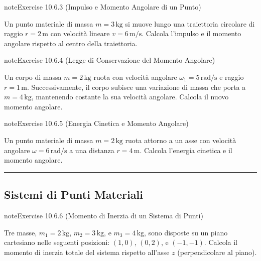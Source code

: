 \documentclass[letterpaper,10pt,italian]{jupyterBook}
\begin{document}
\begin{sphinxadmonition}{note}{Exercise 10.6.3 (Impulso e Momento Angolare di un Punto)}



\sphinxAtStartPar
Un punto materiale di massa \(m = 3 \, \text{kg}\) si muove lungo una traiettoria circolare di raggio \(r = 2 \, \text{m}\) con velocità lineare \(v = 6 \, \text{m/s}\). Calcola l’impulso e il momento angolare rispetto al centro della traiettoria.
\end{sphinxadmonition}
 \label{exercise:ch/mechanics/inertia-problems-exercise-3}

\begin{sphinxadmonition}{note}{Exercise 10.6.4 (Legge di Conservazione del Momento Angolare)}



\sphinxAtStartPar
Un corpo di massa \(m = 2 \, \text{kg}\) ruota con velocità angolare \(\omega_1 = 5 \, \text{rad/s}\) e raggio \(r = 1 \, \text{m}\). Successivamente, il corpo subisce una variazione di massa che porta a \(m = 4 \, \text{kg}\), mantenendo costante la sua velocità angolare. Calcola il nuovo momento angolare.
\end{sphinxadmonition}
 \label{exercise:ch/mechanics/inertia-problems-exercise-4}

\begin{sphinxadmonition}{note}{Exercise 10.6.5 (Energia Cinetica e Momento Angolare)}



\sphinxAtStartPar
Un punto materiale di massa \(m = 2 \, \text{kg}\) ruota attorno a un asse con velocità angolare \(\omega = 6 \, \text{rad/s}\) a una distanza \(r = 4 \, \text{m}\). Calcola l’energia cinetica e il momento angolare.
\end{sphinxadmonition}


\bigskip\hrule\bigskip



\subsection{Sistemi di Punti Materiali}
\label{\detokenize{ch/mechanics/inertia-problems:sistemi-di-punti-materiali}} \label{exercise:ch/mechanics/inertia-problems-exercise-5}

\begin{sphinxadmonition}{note}{Exercise 10.6.6 (Momento di Inerzia di un Sistema di Punti)}



\sphinxAtStartPar
Tre masse, \(m_1 = 2 \, \text{kg}\), \(m_2 = 3 \, \text{kg}\), e \(m_3 = 4 \, \text{kg}\), sono disposte su un piano cartesiano nelle seguenti posizioni: \((1, 0)\), \((0, 2)\), e \((-1, -1)\). Calcola il momento di inerzia totale del sistema rispetto all’asse \(z\) (perpendicolare al piano).
\end{sphinxadmonition}
 \label{exercise:ch/mechanics/inertia-problems-exercise-6}
\end{document}
